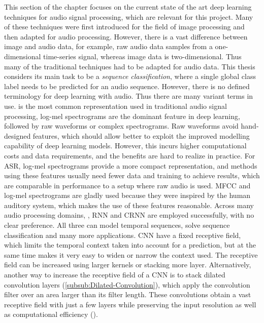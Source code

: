 This section of the chapter focuses on the current state of the art deep learning techniques for audio signal processing, which are relevant for this project. Many of these techniques were first introduced for the field of image processing and then adapted for audio processing. However, there is a vast difference between image and audio data, for example, raw audio data samples from a one-dimensional time-series signal, whereas image data is two-dimensional. Thus many of the traditional techniques had to be adapted for audio data.
\newline
\newline
This thesis considers its main task to be a \textit{sequence classification}, where a single global class label needs to be predicted for an audio sequence. However, there is no defined terminology for deep learning with audio. Thus there are many variant terms in use.
\newline
\newline
{} is the most common representation used in traditional audio signal processing, log-mel spectrograms are the dominant feature in deep learning, followed by raw waveforms or complex spectrograms. Raw waveforms avoid hand-designed features, which should allow better to exploit the improved modelling capability of deep learning models. However, this incurs higher computational costs and data requirements, and the benefits are hard to realize in practice. For \gls{ASR}, log-mel spectrograms provide a more compact representation, and methods using these features usually need fewer data and training to achieve results, which are comparable in performance to a setup where raw audio is used. \gls{MFCC} and log-mel spectrograms are gladly used because they were inspired by the human auditory system, which makes the use of these features reasonable.
\newline
\newline
Across many audio processing domains, , \gls{RNN} and \gls{CRNN} are employed successfully, with no clear preference. All three can model temporal sequences, solve sequence classification and many more applications. \gls{CNN} have a fixed receptive field, which limits the temporal context taken into account for a prediction, but at the same time makes it very easy to widen or narrow the context used. The receptive field can be increased using larger kernels or stacking more layer. Alternatively, another way to increase the receptive field of a \gls{CNN} is to stack dilated convolution layers (\ref{subsub:Dilated-Convolution}), which apply the convolution filter over an area larger than its filter length. These convolutions obtain a vast receptive field with just a few layers while preserving the input resolution as well as computational efficiency (\cite{franceschi_unsupervised_2020}).

